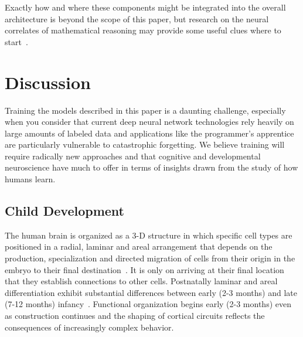 \documentclass[letterpaper,11pt]{article}
\begin{document}
Exactly how and where these components might be integrated into the overall architecture is beyond the scope of this paper, but research on the neural correlates of mathematical reasoning may provide some useful clues where to start~\cite{DehaeneetalCOGNITIVE-NEUROPSYCHOLOGY-03,DehaeneandBrannon2011mathminds,AmalricandDehaenePNAS-16}.






\section{Discussion}


Training the models described in this paper is a daunting challenge, especially when you consider that current deep neural network technologies rely heavily on large amounts of labeled data and applications like the programmer's apprentice are particularly vulnerable to catastrophic forgetting. We believe training will require radically new approaches and that cognitive and developmental neuroscience have much to offer in terms of insights drawn from the study of how humans learn. 


\subsection{Child Development}


The human brain is organized as a 3-D structure in which specific cell types are positioned in a radial, laminar and areal arrangement that depends on the production, specialization and directed migration of cells from their origin in the embryo to their final destination~\cite{RakiketalTCN-09}. It is only on arriving at their final location that they establish connections to other cells. Postnatally laminar and areal differentiation exhibit substantial differences between early (2-3 months) and late (7-12 months) infancy~\cite{MolnaretalJoA-19,KostovicandJudasTCN-09}. Functional organization begins early (2-3 months) even as construction continues and the shaping of cortical circuits reflects the consequences of increasingly complex behavior. 
\end{document}
